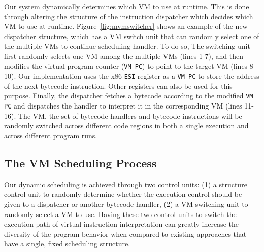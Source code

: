 \documentclass[preprint,12pt,3p]{elsarticle}
\newcommand\FIXME[1]{\textcolor{red}{FIX:}\textcolor{red}{#1}}
\begin{document}
Our system dynamically determines which VM to use at runtime.
This is done through altering the structure of the instruction dispatcher which decides which VM to use at runtime.
Figure~\ref{fig:mvmswitcher} shows an example of the new dispatcher structure,
which has a VM switch unit that can randomly select one of the multiple VMs to continue scheduling handler.
To do so, The switching unit first randomly selects one VM among the multiple VMs (lines 1-7),
and then modifies the virtual program counter (\texttt{VM PC}) to point to the target VM (lines 8-10).
Our implementation uses the x86 \texttt{ESI} register as a \texttt{VM PC} to store the
address of the next bytecode instruction. Other registers can also be used for this purpose.
Finally, the dispatcher fetches a bytecode according to the modified \texttt{VM PC} and
dispatches the handler to interpret it in the corresponding VM (lines 11-16).
The VM, the set of bytecode handlers and bytecode instructions will be randomly switched
across different code regions in both a single execution and across different program runs.

\subsection{The VM Scheduling Process}\label{sec:mvm-2}

Our dynamic scheduling is achieved through two control units: (1) a structure control unit
to randomly determine whether the execution control should be given to a dispatcher or another bytecode handler,
(2) a VM switching unit to randomly select a VM to use. Having these two control units to switch
the execution path of virtual instruction interpretation can greatly increase the
diversity of the program behavior when compared to existing approaches  that
have a single, fixed scheduling structure.
\end{document}
